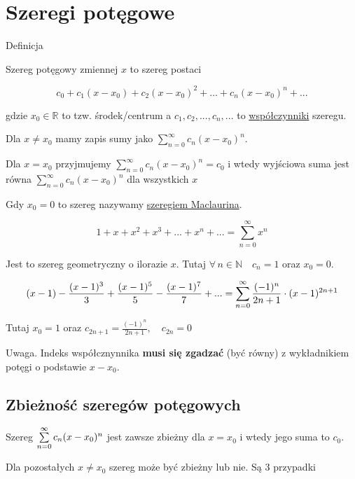 \section{Szeregi potęgowe}

\begin{tw}{Definicja}

Szereg potęgowy zmiennej $x$ to szereg postaci

$$ c_0 + c_1(x - x_0) + c_2(x- x_0)^2 + ... + c_n(x - x_0)^n + ... $$

gdzie $x_0 \in \mathbb{R} $ to tzw. środek/centrum a $ c_1, c_2, ..., c_n, ... $ to \underline{współczynniki} szeregu.

Dla $x \neq x_0$ mamy zapis sumy jako $ \sum\limits_{n = 0}^{\infty} c_n(x - x_0)^n $. 

Dla $x = x_0$ przyjmujemy
$ \sum\limits_{n = 0}^{\infty} c_n(x - x_0)^n = c_0 $ i wtedy wyjściowa suma jest równa $ \sum\limits_{n = 0}^{\infty} c_n(x - x_0)^n $
dla wszystkich $x$

Gdy $x_0 = 0$ to szereg nazywamy \underline{szeregiem Maclaurina}.
\end{tw}

\begin{przyklad}

$$ 1 + x + x^2 + x^3 + ... + x^n + ... = \sum\limits_{n = 0}^{\infty} x^n $$

Jest to szereg geometryczny o ilorazie $x$. Tutaj $ \forall \, n \in \mathbb{N} \quad c_n = 1 $ oraz $x_0 = 0$.
\end{przyklad}

\begin{przyklad}
$$ (x - 1) - \frac{(x-1)^3}{3} + \frac{(x-1)^5}{5} - \frac{(x-1)^7}{7} + ... 
= \sum\limits_{n = 0}^{\infty} \frac{ (-1)^n }{ 2n+1 } \cdot (x-1)^{2n+1} $$

Tutaj $x_0 = 1$ oraz $ c_{2n+1} = \frac{ (-1)^n }{ 2n+1 }, \quad c_{2n} = 0 $
\end{przyklad}

Uwaga. Indeks współcznynnika \textbf{musi się zgadzać} (być równy) z wykładnikiem potęgi o podstawie $x-x_0$.


\subsection{Zbieżność szeregów potęgowych}

Szereg $ \sum\limits_{n = 0}^{\infty} c_n(x-x_0)^n $ jest zawsze zbieżny dla $x=x_0$ i wtedy jego suma to $c_0$.

Dla pozostałych $x \neq x_0$ szereg może być zbieżny lub nie. Są 3 przypadki

